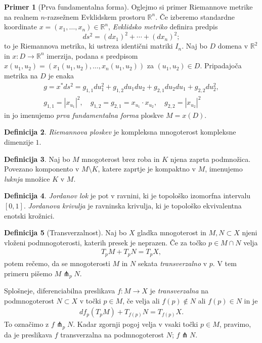 \documentclass[12pt,a4paper,twoside]{article}
\theoremstyle{definition} %
\newtheorem{definicija}{Definicija}[section]
\newtheorem{primer}[definicija]{Primer}
\theoremstyle{plain} %
\numberwithin{equation}{section}  %
\newcommand{\R}{\mathbb R}
\begin{document}
\begin{primer} [Prva fundamentalna forma]
Oglejmo si primer Riemannove metrike na realnem $n$-razsežnem Evklidskem prostoru $\mathbb{R}^{n}$.
Če izberemo standardne koordinate $x = (x_{1}, \dots, x_{n}) \in \mathbb{R}^{n}$, \emph{Evklidsko metriko} definira predpis
\begin{equation}
ds^2 = (dx_{1})^2 + \cdots + (dx_{n})^2;
\end{equation}
to je Riemannova metrika, ki ustreza identični matriki $I_{n}$. Naj bo $D$ domena v $\R^2$ in $x \colon D \to \R^{n}$ imerzija, podana s predpisom $x(u_1,u_2) = (x_{1}(u_1,u_2), \dots, x_{n}(u_1,u_2))$ za $(u_1,u_2) \in D$. Pripadajoča metrika na $D$ je enaka
\begin{gather*}
g = x^{*}ds^2 = g_{1,1}du_{1}^2 + g_{1,2}du_{1}du_{2} + g_{2,1}du_{2}du_{1} + g_{2,2}du_{2}^2, \\
g_{1,1} = |x_{u_1}|^2, \quad g_{1,2} = g_{2,1} = x_{u_1} \cdot x_{u_2}, \quad g_{2,2} = |x_{u_2}|^2
\end{gather*}
in jo imenujemo \emph{prva fundamentalna forma} ploskve $M = x(D)$.
\end{primer}

\begin{definicija}
\emph{Riemannova ploskev} je kompleksna mnogoterost kompleksne dimenzije $1$.
\end{definicija}

\begin{definicija}
Naj bo $M$ mnogoterost brez roba in $K$ njena zaprta podmnožica. Povezano komponento v $M \setminus K$, katere zaprtje je kompaktno v $M$, imenujemo \emph{luknja} množice $K$ v $M$.
\end{definicija}

\begin{definicija}
\emph{Jordanov lok} je pot v ravnini, ki je topološko izomorfna intervalu $[0,1]$.
\emph{Jordanova krivulja} je ravninska krivulja, ki je topološko ekvivalentna enotski krožnici.
\end{definicija}

\begin{definicija} [Transverzalnost]
Naj bo $X$ gladka mnogoterost in $M, N \subset X$ njeni vloženi podmnogoterosti, katerih presek je neprazen.
Če za točko $p \in M \cap N$ velja
\begin{gather*}
T_{p}M + T_{p}N = T_{p}X,
\end{gather*} 
potem rečemo, da se mnogoterosti $M$ in $N$ sekata \emph{transverzalno} v $p$. V tem primeru pišemo $M \pitchfork_{p} N$.

Splošneje, diferenciabilna preslikava $f \colon M \to X$ je \emph{transverzalna} na podmnogoterost $N \subset X$ v točki $p \in M$, če velja ali $f(p) \notin N$ ali $f(p) \in N$ in je
\begin{gather*}
df_{p}(T_{p}M) + T_{f(p)}N = T_{f(p)}X.
\end{gather*}
To označimo z $f \pitchfork_{p} N$. Kadar zgornji pogoj velja v vsaki točki $p \in M$, pravimo, da je preslikava $f$ transverzalna na podmnogoterost $N$; $f \pitchfork N$.
\end{definicija}
\end{document}
